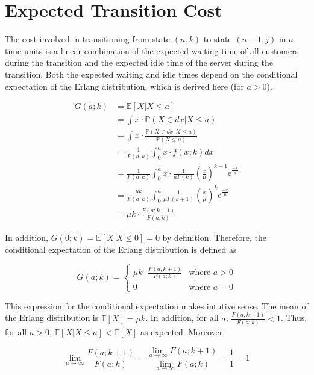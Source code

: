 \section{Expected Transition Cost}

The cost involved in transitioning from state $(n, k)$ to state $(n - 1, j)$ in $a$ time units is a linear combination of the expected waiting time of all customers during the transition and the expected idle time of the server during the transition. Both the expected waiting and idle times depend on the conditional expectation of the Erlang distribution, which is derived here (for $a > 0$).

\begin{align*}
	G (a; k) & = \mathbb{E} [X | X \leq a] \\
	& = \int x \cdot \mathbb{P} (X \in dx | X \leq a) \\
	& = \int x \cdot \frac{\mathbb{P} (X \in dx, X \leq a)}{\mathbb{P} (X \leq a)} \\
	& = \frac{1}{F (a; k)} \int_{0}^{a} x \cdot f(x; k) dx \\
	& = \frac{1}{F (a; k)} \int_{0}^{a} x \cdot \frac{1}{\mu \Gamma (k)} \left( \frac{x}{\mu} \right)^{k - 1} \mathrm{e}^{\frac{-x}{\mu}} \\
	& = \frac{\mu k}{F (a; k)} \int_{0}^{a} \frac{1}{\mu \Gamma (k + 1)} \left( \frac{x}{\mu} \right)^{k} \mathrm{e}^{\frac{-x}{\mu}} \\
	& = \mu k \cdot \frac{F (a; k + 1)}{F (a; k)}
\end{align*}

In addition, $G (0; k) = \mathbb{E} [X | X \leq 0] = 0$ by definition. Therefore, the conditional expectation of the Erlang distribution is defined as

\begin{equation}
	G (a; k) = \begin{cases} \mu k \cdot \frac{F (a; k + 1)}{F (a; k)} & \text{where $a > 0$} \\ 0 & \text{where $a = 0$} \end{cases}
\end{equation}

This expression for the conditional expectation makes intutive sense. The mean of the Erlang distribution is $\mathbb{E} [X] = \mu k$. In addition, for all $a$, $\frac{F (a; k + 1)}{F (a; k)} < 1$. Thus, for all $a > 0$, $\mathbb{E} [X | X \leq a] < \mathbb{E} [X]$ as expected. Moreover, 

\begin{equation}
	\lim_{a \to \infty} \frac{F (a; k + 1)}{F (a; k)} = \frac{\displaystyle \lim_{a \to \infty} F (a; k + 1)}{\displaystyle \lim_{a \to \infty} F (a; k)} = \frac{1}{1} = 1
\end{equation}

